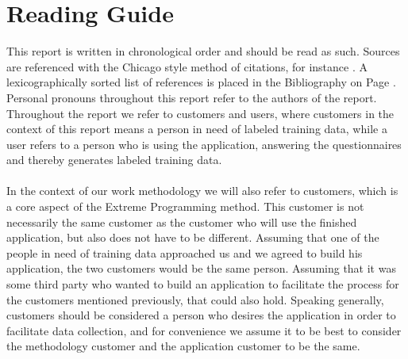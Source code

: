 
\section*{Reading Guide}

This report is written in chronological order and should be read as such. Sources are referenced with the Chicago style method of citations, for instance \parencite{android_adb}. A lexicographically sorted list of references is placed in the Bibliography on Page \pageref{bibliografi}. Personal pronouns throughout this report refer to the authors of the report. Throughout the report we refer to customers and users, where customers in the context of this report means a person in need of labeled training data, while a user refers to a person who is using the application, answering the questionnaires and thereby generates labeled training data. 
\\\\
In the context of our work methodology we will also refer to customers, which is a core aspect of the Extreme Programming method. This customer is not necessarily the same customer as the customer who will use the finished application, but also does not have to be different. Assuming that one of the people in need of training data approached us and we agreed to build his application, the two customers would be the same person. Assuming that it was some third party who wanted to build an application to facilitate the process for the customers mentioned previously, that could also hold. Speaking generally, customers should be considered a person who desires the application in order to facilitate data collection, and for convenience we assume it to be best to consider the methodology customer and the application customer to be the same. 